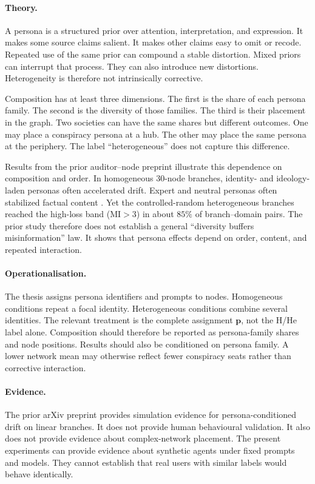 \paragraph{Theory.}
A persona is a structured prior over attention, interpretation, and expression.
It makes some source claims salient.
It makes other claims easy to omit or recode.
Repeated use of the same prior can compound a stable distortion.
Mixed priors can interrupt that process.
They can also introduce new distortions.
Heterogeneity is therefore not intrinsically corrective.

Composition has at least three dimensions.
The first is the share of each persona family.
The second is the diversity of those families.
The third is their placement in the graph.
Two societies can have the same shares but different outcomes.
One may place a conspiracy persona at a hub.
The other may place the same persona at the periphery.
The label ``heterogeneous'' does not capture this difference.

Results from the prior auditor--node preprint illustrate this dependence on composition and order.
In homogeneous 30-node branches, identity- and ideology-laden personas often accelerated drift.
Expert and neutral personas often stabilized factual content \parencite{maurya2025simulating}.
Yet the controlled-random heterogeneous branches reached the high-loss band
(\(\mathrm{MI}>3\)) in about \(85\%\) of branch--domain pairs.
The prior study therefore does not establish a general ``diversity buffers misinformation'' law.
It shows that persona effects depend on order, content, and repeated interaction.

\paragraph{Operationalisation.}
The thesis assigns persona identifiers and prompts to nodes.
Homogeneous conditions repeat a focal identity.
Heterogeneous conditions combine several identities.
The relevant treatment is the complete assignment \(\boldsymbol{p}\), not the H/He label alone.
Composition should therefore be reported as persona-family shares and node positions.
Results should also be conditioned on persona family.
A lower network mean may otherwise reflect fewer conspiracy seats rather than corrective interaction.

\paragraph{Evidence.}
The prior arXiv preprint provides simulation evidence for persona-conditioned drift on linear branches.
It does not provide human behavioural validation.
It also does not provide evidence about complex-network placement.
The present experiments can provide evidence about synthetic agents under fixed prompts and models.
They cannot establish that real users with similar labels would behave identically.


